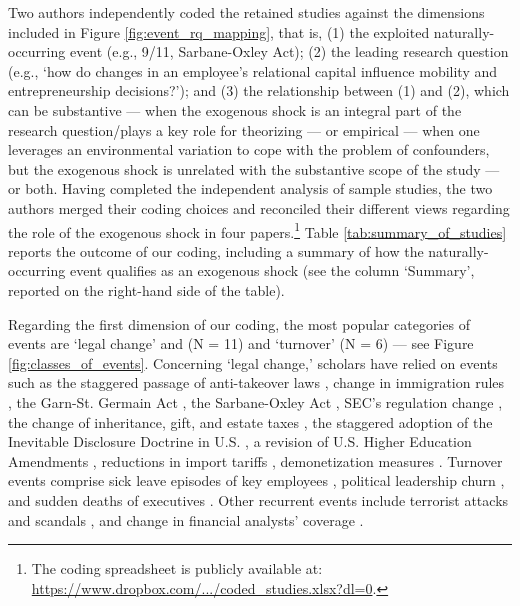 \documentclass[11pt]{article}
\begin{document}
\begin{refsection}
Two authors independently coded the retained studies against the dimensions 
included in Figure \ref{fig:event_rq_mapping}, that is, (1) the exploited 
naturally-occurring event (e.g., 9/11, Sarbane-Oxley Act); (2) the leading
research question (e.g., `how do changes in an employee's relational capital
influence mobility and entrepreneurship decisions?'); and (3) the relationship
between (1) and (2), which can be substantive --- when the exogenous shock is an
integral part of the research question/plays a key role for theorizing 
--- or empirical --- when one leverages an environmental variation to cope
with the problem of confounders, but the exogenous shock is unrelated with the
substantive scope of the study --- or both. Having completed the independent 
analysis of sample studies, the two authors merged their coding choices and 
reconciled their different views regarding the role of the exogenous shock 
in four papers.\footnote{The coding spreadsheet is publicly available at: \href{
  https://www.dropbox.com/s/yl0sf9p9tq253fy/coded_studies.csv?dl=0}
{https://www.dropbox.com/.../coded\_studies.xlsx?dl=0}.} 
Table \ref{tab:summary_of_studies} reports the outcome of our coding, including
a summary of how the naturally-occurring event qualifies as an exogenous
shock (see the column `Summary', reported on the right-hand side of the table).

Regarding the first dimension of our coding, the most popular categories of 
events are `legal change' and (N = 11) and `turnover' (N = 6) --- see Figure 
\ref{fig:classes_of_events}. Concerning `legal change,' scholars have relied on
events such as the staggered passage of anti-takeover laws 
\autocite{cabral202128,wang20162393}, change in immigration rules 
\autocite{choudhury2019203}, the Garn-St. Germain Act
\autocite{haveman2001253}, the Sarbane-Oxley Act \autocite{gupta2020802},
SEC's regulation change \autocite{jia2020290}, the change of inheritance, gift,
and estate taxes \autocite{kang20201300}, the staggered adoption of the
Inevitable Disclosure Doctrine in U.S. \autocite{kang20201300}, a revision of
U.S. Higher Education Amendments \autocite{krishnan20194522}, reductions in
import tariffs \autocite{li20194011}, demonetization measures
\autocite{natarajan20191070}.  Turnover events comprise sick leave episodes of
key employees \autocite{chen20181239,drexler20142722,chown2015177,}, political
leadership churn \autocite{birhanu2020,byun20191368}, and sudden deaths
of executives \autocite{ke2019439}. Other recurrent events include terrorist
attacks \autocite{corbo2016323,vergne20121027,li20194011} and scandals
\autocite{cai2019159,hilary2021}, and change in financial analysts' coverage
\autocite{chatterji2010917,qian20192271}.


\end{refsection}
\end{document}
